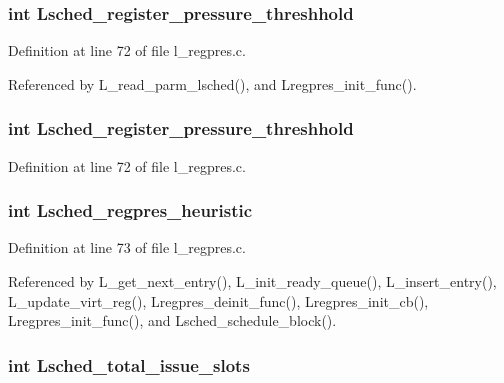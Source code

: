 \subsubsection{\setlength{\rightskip}{0pt plus 5cm}int \bf{Lsched\_\-register\_\-pressure\_\-threshhold}}\label{l__schedule_8h_d6b0405973ba10a6f980c3dcc31abeb5}




Definition at line 72 of file l\_\-regpres.c.

Referenced by L\_\-read\_\-parm\_\-lsched(), and Lregpres\_\-init\_\-func().
\subsubsection{\setlength{\rightskip}{0pt plus 5cm}int \bf{Lsched\_\-register\_\-pressure\_\-threshhold}}\label{l__schedule_8h_d6b0405973ba10a6f980c3dcc31abeb5}




Definition at line 72 of file l\_\-regpres.c.
\subsubsection{\setlength{\rightskip}{0pt plus 5cm}int \bf{Lsched\_\-regpres\_\-heuristic}}\label{l__schedule_8h_b801097b81716757db39ca58936d99d8}




Definition at line 73 of file l\_\-regpres.c.

Referenced by L\_\-get\_\-next\_\-entry(), L\_\-init\_\-ready\_\-queue(), L\_\-insert\_\-entry(), L\_\-update\_\-virt\_\-reg(), Lregpres\_\-deinit\_\-func(), Lregpres\_\-init\_\-cb(), Lregpres\_\-init\_\-func(), and Lsched\_\-schedule\_\-block().
\subsubsection{\setlength{\rightskip}{0pt plus 5cm}int \bf{Lsched\_\-total\_\-issue\_\-slots}}\label{l__schedule_8h_7511cf13b18125e863ce2bb076d8f1cd}





